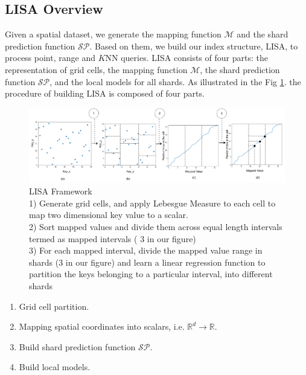 \subsection{LISA Overview}


Given a spatial dataset, we generate the mapping function $\mathcal{M}$ and the shard prediction function $\mathcal{SP}$. Based on them, we build our index structure, LISA, to process point, range and $K$NN queries. LISA consists of four parts: the representation of grid cells, the mapping function $\mathcal{M}$, the shard prediction function $\mathcal{SP}$, and the local models for all shards. As illustrated in the Fig \ref{fig:LISA_Framework}. the procedure of building LISA is composed of four parts.

\begin{figure}[t]
    \centering
\includegraphics[width=1\textwidth]{graphs/implementation/lisa_overview.pdf}
    \caption{LISA Framework\\
     1) Generate grid cells, and apply Lebesgue Measure to each cell to map two dimensional key value to a scalar.\\
    2) Sort mapped values and divide them across equal length intervals termed as mapped intervals ( 3 in our figure)\\
    3) For each mapped interval, divide the mapped value range in shards  (3 in our figure) and learn a linear regression function to partition the keys belonging to a particular interval, into different shards }
    \label{fig:LISA_Framework}
\end{figure}

\begin{enumerate}
	\item Grid cell partition.
	\item Mapping spatial coordinates into scalars, i.e. $\mathbb{R}^d\to\mathbb{R}$.
	\item Build shard prediction function $\mathcal{SP}$.
	\item Build local models.
\end{enumerate}

